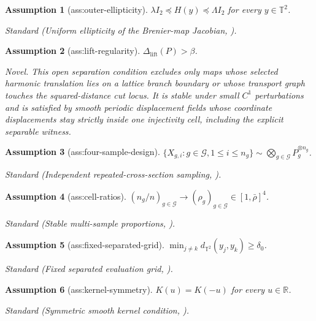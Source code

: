\documentclass{article}
\newtheorem{assumption}{Assumption}
\begin{document}
\begin{assumption}[ass:outer-ellipticity]\label{ass:outer-ellipticity}
\(\lambda I_2\preceq H(y)\preceq\Lambda I_2\) for every \(y\in\mathbb T^2\).
\par\smallskip\noindent\emph{Standard} (Uniform ellipticity of the Brenier-map Jacobian, \cite{HutterRigollet2021Minimax}).
\end{assumption}

\begin{assumption}[ass:lift-regularity]\label{ass:lift-regularity}
\(\Delta_{\mathrm{lift}}(P)>\beta\).
\par\smallskip\noindent\emph{Novel.} This open separation condition excludes only maps whose selected harmonic translation lies on a lattice branch boundary or whose transport graph touches the squared-distance cut locus. It is stable under small \(C^1\) perturbations and is satisfied by smooth periodic displacement fields whose coordinate displacements stay strictly inside one injectivity cell, including the explicit separable witness.
\end{assumption}

\begin{assumption}[ass:four-sample-design]\label{ass:four-sample-design}
\(\{X_{g,i}:g\in\mathcal G,1\leq i\leq n_g\}\sim\bigotimes_{g\in\mathcal G}P_g^{\otimes n_g}\).
\par\smallskip\noindent\emph{Standard} (Independent repeated-cross-section sampling, \cite{TorousGunsiliusRigollet2024OTCiC}).
\end{assumption}

\begin{assumption}[ass:cell-ratios]\label{ass:cell-ratios}
\((n_g/n)_{g\in\mathcal G}\to(\rho_g)_{g\in\mathcal G}\in[1,\bar\rho]^4\).
\par\smallskip\noindent\emph{Standard} (Stable multi-sample proportions, \cite{PonnopratOkanoImaizumi2024UniformBand}).
\end{assumption}

\begin{assumption}[ass:fixed-separated-grid]\label{ass:fixed-separated-grid}
\(\min_{j\neq k}d_{\mathbb T^2}(y_j,y_k)\geq\delta_0\).
\par\smallskip\noindent\emph{Standard} (Fixed separated evaluation grid, \cite{ManoleBalakrishnanNilesWeedWasserman2023CLT}).
\end{assumption}

\begin{assumption}[ass:kernel-symmetry]\label{ass:kernel-symmetry}
\(K(u)=K(-u)\) for every \(u\in\mathbb R\).
\par\smallskip\noindent\emph{Standard} (Symmetric smooth kernel condition, \cite{ManoleBalakrishnanNilesWeedWasserman2023CLT}).
\end{assumption}
\end{document}
